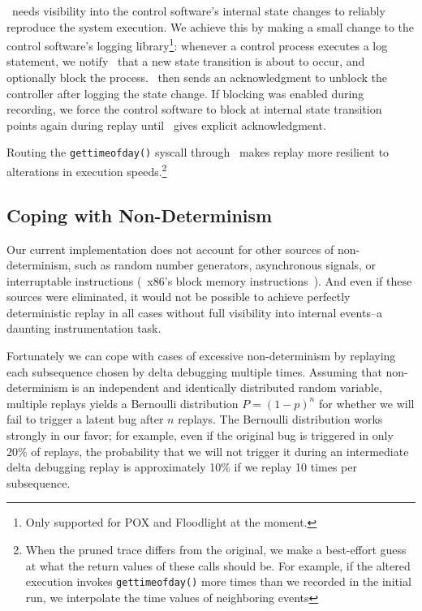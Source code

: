 \projectname~needs visibility into the control software's internal state
changes to reliably reproduce the system execution. We achieve this by
making a
small change to the control software's logging library\footnote{Only supported
for POX and Floodlight at the moment.}: whenever a control process executes a log
statement, we notify \projectname~that a new state transition
is about to occur, and optionally block the process. \projectname~then sends
an acknowledgment to unblock the controller after logging the state change. If blocking was enabled
during recording, we force the control software to block at internal state
transition points again during replay
until \projectname~gives explicit acknowledgment.

Routing the {\tt gettimeofday()} syscall
through \projectname~makes replay more resilient to alterations in execution
speeds.\footnote{When the pruned trace differs from the original, we make a
best-effort guess at what the return values of these calls should be. For example,
if the altered execution invokes {\tt gettimeofday()} more times than we recorded
in the initial run, we interpolate the time values of neighboring events}

\subsection{Coping with Non-Determinism}

Our current implementation does not account for other sources of non-determinism,
such as random number generators, asynchronous signals,
or interruptable instructions (\eg~x86's block memory
instructions~\cite{Dunlap:2002:REI:844128.844148}). And even if these sources were
eliminated, it would not be possible to achieve perfectly deterministic
replay in all cases without full visibility into internal events--a daunting
instrumentation task.

Fortunately we can cope with cases of excessive non-determinism by replaying each subsequence chosen
by delta debugging multiple times. Assuming that non-determinism
is an independent and identically distributed random variable, multiple
replays yields a Bernoulli distribution $P = (1-p)^{n}$ for whether we will fail to
trigger a latent bug after $n$ replays. The Bernoulli distribution
works strongly in our favor; for example, even if the original bug is
triggered in only 20\% of replays, the probability that we will not trigger
it during an intermediate delta debugging replay is approximately
10\% if we replay 10 times per subsequence.
